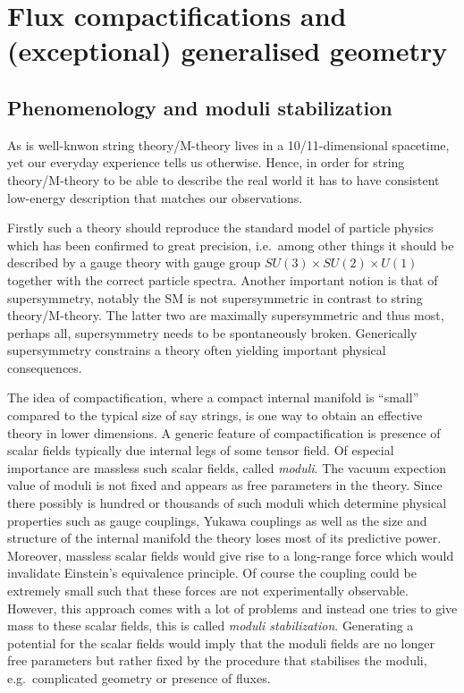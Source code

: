 \chapter{Flux compactifications and (exceptional) generalised geometry\label{chap:FluxCompactifications}}

\section{Phenomenology and moduli stabilization}
As is well-knwon string theory/M-theory lives in a 10/11-dimensional spacetime, yet our everyday experience tells us otherwise. Hence, in order for string theory/M-theory to be able to describe the real world it has to have consistent low-energy description that matches our observations. 

Firstly such a theory should reproduce the standard model of particle physics which has been confirmed to great precision, i.e.\ among other things it should be described by a gauge theory with gauge group $SU(3)\times SU(2)\times U(1)$ together with the correct particle spectra. Another important notion is that of supersymmetry, notably the SM is not supersymmetric in contrast to string theory/M-theory. The latter two are maximally supersymmetric and thus most, perhaps all, supersymmetry needs to be spontaneously broken. Generically supersymmetry constrains a theory often yielding important physical consequences.

The idea of compactification, where a compact internal manifold is ``small'' compared to the typical size of say strings, is one way to obtain an effective theory in lower dimensions. A generic feature of compactification is presence of scalar fields typically due internal legs of some tensor field. Of especial importance are massless such scalar fields, called \emph{moduli}. The vacuum expection value of moduli is not fixed and appears as free parameters in the theory. Since there possibly is hundred or thousands of such moduli which determine physical properties such as gauge couplings, Yukawa couplings as well as the size and structure of the internal manifold the theory loses most of its predictive power. Moreover, massless scalar fields would give rise to a long-range force which would invalidate Einstein's equivalence principle. Of course the coupling could be extremely small such that these forces are not experimentally observable. However, this approach comes with a lot of problems  and instead one tries to give mass to these scalar fields, this is called \emph{moduli stabilization}. Generating a potential for the scalar fields would imply that the moduli fields are no longer free parameters but rather fixed by the procedure that stabilises the moduli, e.g.\ complicated geometry or presence of fluxes. 

